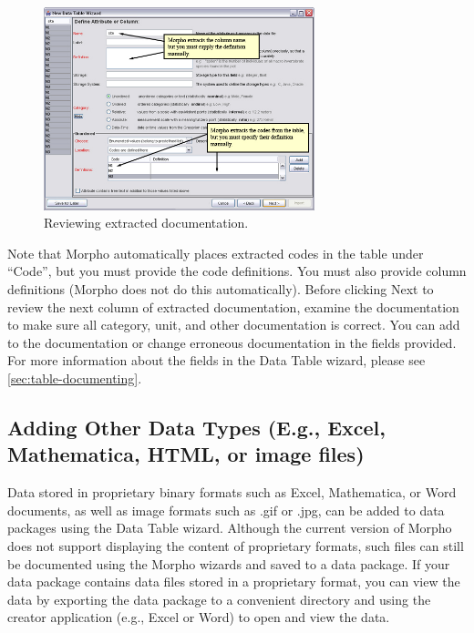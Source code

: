 \begin{figure}
  \centering
    \includegraphics[width=0.7\textwidth]{images/wizard-table-attribute-extraction}
  \caption{Reviewing extracted documentation.}
  \label{fig:wizard-table-attribute-extraction}
\end{figure}

Note that Morpho automatically places extracted codes in the table under
``Code'', but you must provide the code definitions. You must also
provide column definitions (Morpho does not do this automatically).
Before clicking Next to review the next column of extracted
documentation, examine the documentation to make sure all category,
unit, and other documentation is correct. You can add to the
documentation or change erroneous documentation in the fields provided.
For more information about the fields in the Data Table wizard, please
see \autoref{sec:table-documenting}.

\subsection[Adding Other Data Types]{Adding Other Data Types (E.g.,
Excel, Mathematica, HTML, or image files)} \label{sec:table-other-types}

Data stored in proprietary binary formats such as Excel, Mathematica, or
Word documents, as well as image formats such as .gif or .jpg, can be
added to data packages using the Data Table wizard. Although the current
version of Morpho does not support displaying the content of proprietary
formats, such files can still be documented using the Morpho wizards and
saved to a data package. If your data package contains data files stored
in a proprietary format, you can view the data by exporting the data
package to a convenient directory and using the creator application
(e.g., Excel or Word) to open and view the data.

